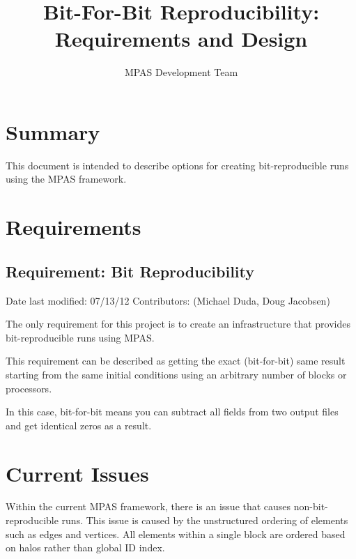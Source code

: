 \documentclass[11pt]{report}
\begin{document}
\title{Bit-For-Bit Reproducibility: \\
Requirements and Design}
\author{MPAS Development Team}

\maketitle
\tableofcontents


\chapter{Summary}

This document is intended to describe options for creating bit-reproducible runs using the MPAS framework.


\chapter{Requirements}

\section{Requirement: Bit Reproducibility}
Date last modified: 07/13/12
Contributors: (Michael Duda, Doug Jacobsen)

The only requirement for this project is to create an infrastructure that provides bit-reproducible runs using MPAS.

This requirement can be described as getting the exact (bit-for-bit) same result starting from the same initial conditions using an arbitrary number of blocks or processors.

In this case, bit-for-bit means you can subtract all fields from two output files and get identical zeros as a result.

\chapter{Current Issues}

Within the current MPAS framework, there is an issue that causes non-bit-reproducible runs. This issue is caused by the unstructured ordering of elements such as edges and vertices. All elements within a single block are ordered based on halos rather than global ID index.
\end{document}
